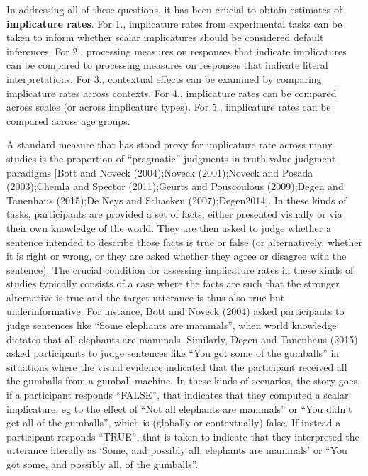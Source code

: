 \documentclass[floatsintext,man]{apa6}
\theoremstyle{definition}
\theoremstyle{definition}
\theoremstyle{definition}
\theoremstyle{remark}
\begin{document}
In addressing all of these questions, it has been crucial to obtain
estimates of \textbf{implicature rates}. For 1., implicature rates from
experimental tasks can be taken to inform whether scalar implicatures
should be considered default inferences. For 2., processing measures on
responses that indicate implicatures can be compared to processing
measures on responses that indicate literal interpretations. For 3.,
contextual effects can be examined by comparing implicature rates across
contexts. For 4., implicature rates can be compared across scales (or
across implicature types). For 5., implicature rates can be compared
across age groups.

A standard measure that has stood proxy for implicature rate across many
studies is the proportion of \enquote{pragmatic} judgments in
truth-value judgment paradigms {[}Bott and Noveck (2004);Noveck
(2001);Noveck and Posada (2003);Chemla and Spector (2011);Geurts and
Pouscoulous (2009);Degen and Tanenhaus (2015);De Neys and Schaeken
(2007);Degen2014{]}. In these kinds of tasks, participants are provided
a set of facts, either presented visually or via their own knowledge of
the world. They are then asked to judge whether a sentence intended to
describe those facts is true or false (or alternatively, whether it is
right or wrong, or they are asked whether they agree or disagree with
the sentence). The crucial condition for assessing implicature rates in
these kinds of studies typically consists of a case where the facts are
such that the stronger alternative is true and the target utterance is
thus also true but underinformative. For instance, Bott and Noveck
(2004) asked participants to judge sentences like \enquote{Some
elephants are mammals}, when world knowledge dictates that all elephants
are mammals. Similarly, Degen and Tanenhaus (2015) asked participants to
judge sentences like \enquote{You got some of the gumballs} in
situations where the visual evidence indicated that the participant
received all the gumballs from a gumball machine. In these kinds of
scenarios, the story goes, if a participant responds \enquote{FALSE},
that indicates that they computed a scalar implicature, eg to the effect
of \enquote{Not all elephants are mammals} or \enquote{You didn't get
all of the gumballs}, which is (globally or contextually) false. If
instead a participant responds \enquote{TRUE}, that is taken to indicate
that they interpreted the utterance literally as `Some, and possibly
all, elephants are mammals' or \enquote{You got some, and possibly all,
of the gumballs}.
\end{document}
